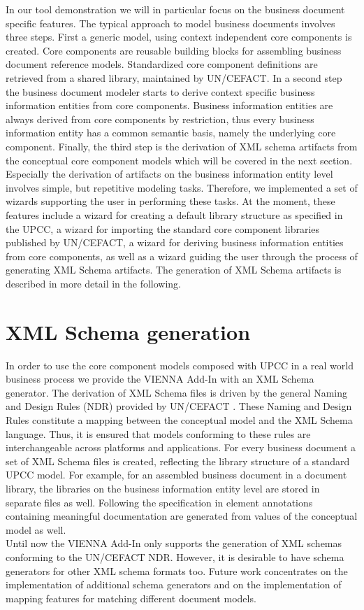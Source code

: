 \documentclass{acm_proc_article-sp}
\begin{document}
In our tool demonstration we will in particular focus on the business document specific features. The typical approach to model business documents involves three steps. First a generic model, using context independent core components is created. Core components are reusable building blocks for assembling business document reference models. Standardized core component definitions are retrieved from a shared library, maintained by UN/CEFACT. In a second step the business document modeler starts to derive context specific business information entities from core components. Business information entities are always derived from core components by restriction, thus every business information entity has a common semantic basis, namely the underlying core component. Finally, the third step is the derivation of XML schema artifacts from the conceptual core component models which will be covered in the next section. \\Especially the derivation of artifacts on the business information entity level involves simple, but repetitive modeling tasks. Therefore, we implemented a set of wizards supporting the user in performing these tasks. At the moment, these features include a wizard for creating a default library structure as specified in the UPCC, a wizard for importing the standard core component libraries published by UN/CEFACT, a wizard for deriving business information entities from core components, as well as a wizard guiding the user through the process of generating XML Schema artifacts. The generation of XML Schema artifacts is described in more detail in the following. 

\section{XML Schema generation}
In order to use the core component models composed with UPCC in a real world business process we provide the VIENNA Add-In with an XML Schema generator. The derivation of XML Schema files is driven by the general Naming and Design Rules (NDR) provided by UN/CEFACT \cite{CEFACT:NDR}. These Naming and Design Rules constitute a mapping between the conceptual model and the XML Schema language. Thus, it is ensured that models conforming to these rules are interchangeable across platforms and applications. For every business document a set of XML Schema files is created, reflecting the library structure of a standard UPCC model. For example, for an assembled business document in a document library, the libraries on the business information entity level are stored in separate files as well. Following the specification in \cite{CEFACT:NDR} element annotations containing meaningful documentation are generated from values of the conceptual model as well. \\Until now the VIENNA Add-In only supports the generation of XML schemas conforming to the UN/CEFACT NDR. However, it is desirable to have schema generators for other XML schema formats too. Future work concentrates on the implementation of additional schema generators and on the implementation of mapping features for matching different document models.



  
\end{document}
